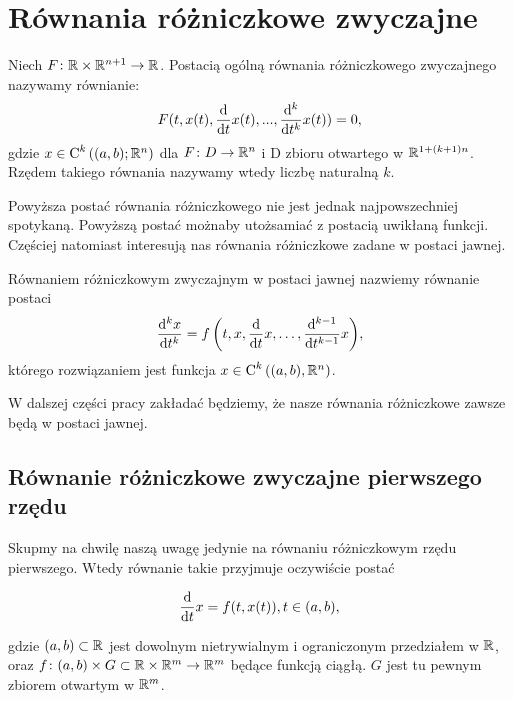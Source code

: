 \documentclass[12pt,a4paper]{report}
\begin{document}
\section{Równania różniczkowe zwyczajne}

\begin{definition} 
Niech $F \colon \setR \times \setR^{n+1} \to \setR$. Postacią ogólną równania różniczkowego zwyczajnego nazywamy równianie: 
\begin{equation*}
F(t, x(t), \ddx{t} x(t),..., \ddx[^k]{t^k} x(t) ) = 0,
\end{equation*}
gdzie $x \in \Ck{k}{(a,b); \setR^n}$ dla $F \colon D \to \setR^n$ i D zbioru otwartego w $\setR^{1+(k+1)n}$. 
Rzędem takiego równania nazywamy wtedy liczbę naturalną $k$. 
\end{definition}

Powyższa postać równania różniczkowego nie jest jednak najpowszechniej spotykaną. Powyższą postać możnaby utożsamiać z postacią uwikłaną funkcji. Częściej natomiast interesują nas równania różniczkowe zadane w postaci jawnej.

\begin{definition}
Równaniem różniczkowym zwyczajnym w postaci jawnej nazwiemy równanie postaci
$$
\ddx[{^k x}]{t^k} = \function{f}{t,x,\ddx{t}x, \ldots, \ddx[{^{k-1}}]{t^{k-1}} x},
$$
którego rozwiązaniem jest funkcja $x \in \Ck{k}{(a,b), \setR^n}$.
\end{definition}


W dalszej części pracy zakładać będziemy, że nasze równania różniczkowe zawsze będą w postaci jawnej.


\subsection{Równanie różniczkowe zwyczajne pierwszego rzędu}

Skupmy na chwilę naszą uwagę jedynie na równaniu różniczkowym rzędu pierwszego. Wtedy równanie takie przyjmuje oczywiście postać 

$$
\ddx{t}x = f(t,x(t)), t \in (a,b) ,
$$ 

gdzie $(a,b) \subset \setR$ jest dowolnym nietrywialnym i ograniczonym przedziałem w $\setR$, oraz $ f \colon (a,b) \times G \subset \setR \times \setR^m \to \setR^m$ będące funkcją ciągłą. $G$ jest tu pewnym zbiorem otwartym w $\setR^m$. 
\end{document}

